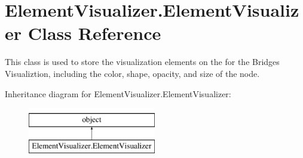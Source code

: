 \hypertarget{class_element_visualizer_1_1_element_visualizer}{}\section{Element\+Visualizer.\+Element\+Visualizer Class Reference}
\label{class_element_visualizer_1_1_element_visualizer}


This class is used to store the visualization elements on the for the Bridges Visualiztion, including the color, shape, opacity, and size of the node.  


Inheritance diagram for Element\+Visualizer.\+Element\+Visualizer\+:\begin{figure}[H]
\begin{center}
\leavevmode
\includegraphics[height=2.000000cm]{class_element_visualizer_1_1_element_visualizer}
\end{center}
\end{figure}
